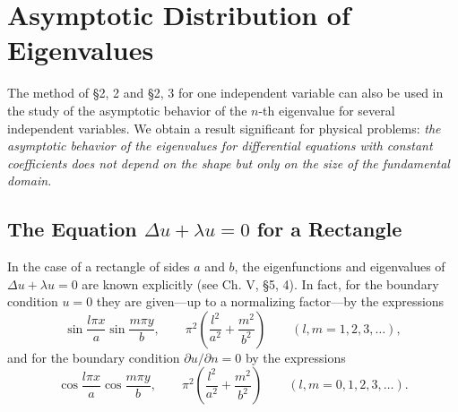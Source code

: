 \section{Asymptotic Distribution of Eigenvalues}
The method of \S2, 2 and \S2, 3 for one independent variable can also be used in the study of the asymptotic behavior of the $n$-th eigenvalue for several independent variables. We obtain a result significant for physical problems: \emph{the asymptotic behavior of the eigenvalues for differential equations with constant coefficients does not depend on the shape but only on the size of the fundamental domain.}

\subsection{The Equation $\Delta u+\lambda u=0$ for a Rectangle}
In the case of a rectangle of sides $a$ and $b$, the eigenfunctions and eigenvalues of $\Delta u+\lambda u=0$ are known explicitly (see Ch. V, \S5, 4). In fact, for the boundary condition $u=0$ they are given---up to a normalizing factor---by the expressions
\[
\sin\frac{l\pi x}{a}\sin\frac{m\pi y}{b},
\qquad
\pi^2\left(\frac{l^2}{a^2}+\frac{m^2}{b^2}\right)
\qquad(l,m=1,2,3,\ldots),
\]
and for the boundary condition $\partial u/\partial n=0$ by the expressions
\[
\cos\frac{l\pi x}{a}\cos\frac{m\pi y}{b},
\qquad
\pi^2\left(\frac{l^2}{a^2}+\frac{m^2}{b^2}\right)
\qquad(l,m=0,1,2,3,\ldots).
\]

